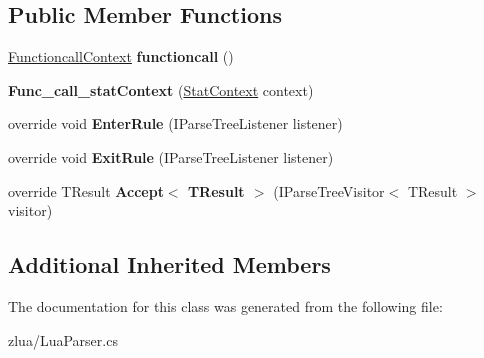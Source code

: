 \subsection*{Public Member Functions}
\begin{DoxyCompactItemize}
\item 
\mbox{\label{classzlua_1_1_lua_parser_1_1_func__call__stat_context_a32d3406f052ead20bc61b1ddc3087dad}} 
\mbox{\hyperlink{classzlua_1_1_lua_parser_1_1_functioncall_context}{Functioncall\+Context}} {\bfseries functioncall} ()
\item 
\mbox{\label{classzlua_1_1_lua_parser_1_1_func__call__stat_context_ad6f542ac2da7617814d55c090bfbfa4b}} 
{\bfseries Func\+\_\+call\+\_\+stat\+Context} (\mbox{\hyperlink{classzlua_1_1_lua_parser_1_1_stat_context}{Stat\+Context}} context)
\item 
\mbox{\label{classzlua_1_1_lua_parser_1_1_func__call__stat_context_a2684f23aa335f0310ccc266c82329535}} 
override void {\bfseries Enter\+Rule} (I\+Parse\+Tree\+Listener listener)
\item 
\mbox{\label{classzlua_1_1_lua_parser_1_1_func__call__stat_context_af5f3da5db84f471215668f79c226d55b}} 
override void {\bfseries Exit\+Rule} (I\+Parse\+Tree\+Listener listener)
\item 
\mbox{\label{classzlua_1_1_lua_parser_1_1_func__call__stat_context_ad88cbcc31be648c2c3cf3e19c6518609}} 
override T\+Result {\bfseries Accept$<$ T\+Result $>$} (I\+Parse\+Tree\+Visitor$<$ T\+Result $>$ visitor)
\end{DoxyCompactItemize}
\subsection*{Additional Inherited Members}


The documentation for this class was generated from the following file\+:\begin{DoxyCompactItemize}
\item 
zlua/Lua\+Parser.\+cs\end{DoxyCompactItemize}
